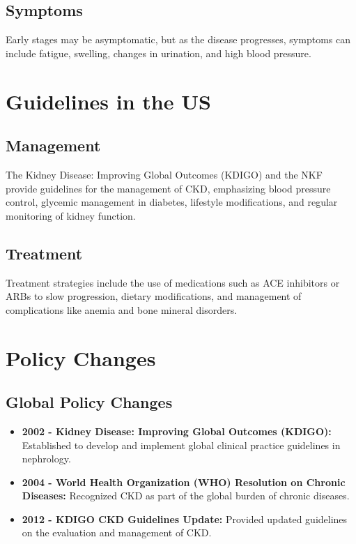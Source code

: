 \documentclass{article}
\begin{document}
\subsection{Symptoms}
Early stages may be asymptomatic, but as the disease progresses, symptoms can include fatigue, swelling, changes in urination, and high blood pressure.

\section{Guidelines in the US}
\subsection{Management}
The Kidney Disease: Improving Global Outcomes (KDIGO) and the NKF provide guidelines for the management of CKD, emphasizing blood pressure control, glycemic management in diabetes, lifestyle modifications, and regular monitoring of kidney function.

\subsection{Treatment}
Treatment strategies include the use of medications such as ACE inhibitors or ARBs to slow progression, dietary modifications, and management of complications like anemia and bone mineral disorders.

\section{Policy Changes}
\subsection{Global Policy Changes}
\begin{itemize}
    \item \textbf{2002 - Kidney Disease: Improving Global Outcomes (KDIGO):} Established to develop and implement global clinical practice guidelines in nephrology.
    \item \textbf{2004 - World Health Organization (WHO) Resolution on Chronic Diseases:} Recognized CKD as part of the global burden of chronic diseases.
    \item \textbf{2012 - KDIGO CKD Guidelines Update:} Provided updated guidelines on the evaluation and management of CKD.
\end{itemize}
\end{document}
